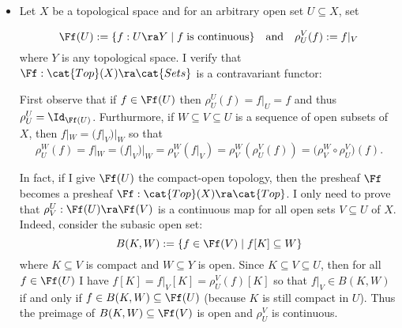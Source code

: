 \begin{examples*} $\;$\\%
%  
\renewcommand{\labelitemi}{$\square$}
\begin{itemize}
\item Let $X$ be a topological space and for an arbitrary open set $U\subseteq X$, set

  \[
    \Ff(U):=\{f:U\ra Y\mid f\;\text{is continuous}\} \quad\text{and}\quad \rho^V_U(f):=f|_{V}
  \]
  where $Y$ is any topological space. I verify that $\Ff:\cat{Top}(X)\ra\cat{Sets}$ is a
  contravariant functor:

  First observe that if $f\in\Ff(U)$ then $\rho^U_U(f)=f|_U=f$ and thus
  $\rho^U_U=\Id_{\Ff(U)}$. Furthurmore, if $W\subseteq V\subseteq U$ is a sequence of open
  subsets of $X$, then $f|_W=(f|_V)|_W$ so that
  \[
    \rho^W_U(f)=
    f|_W=
    (f|_V)|_W=
    \rho^W_V(f|_V)=
    \rho^W_V(\rho^V_U(f))=
    \big(\rho^W_V\circ\rho^V_U\big)(f).
  \]

  In fact, if I give $\Ff(U)$ the compact-open topology, then the presheaf $\Ff$ becomes
  a presheaf $\Ff:\cat{Top}(X)\ra\cat{Top}$. I only need to prove that $\rho^U_V:\Ff(U)\ra\Ff(V)$
  is a continuous map for all open sets $V\subseteq U$ of $X$. Indeed, consider the subasic
  open set:
  \[
    B(K,W):=\{f\in\Ff(V)\mid f[K]\subseteq W\}
  \]
  where $K\subseteq V$ is compact and $W\subseteq Y$ is open. Since $K\subseteq V\subseteq U$,
  then for all $f\in\Ff(U)$ I have $f[K]=f|_V[K]=\rho^V_U(f)[K]$ so that $f|_V\in B(K,W)$ if
  and only if $f\in B(K,W)\subseteq\Ff(U)$ (because $K$ is still compact in $U$). Thus
  the preimage of $B(K,W)\subseteq\Ff(V)$ is open and $\rho^V_U$ is continuous.  
\end{itemize}%
%
% 
%
%  
\end{examples*}